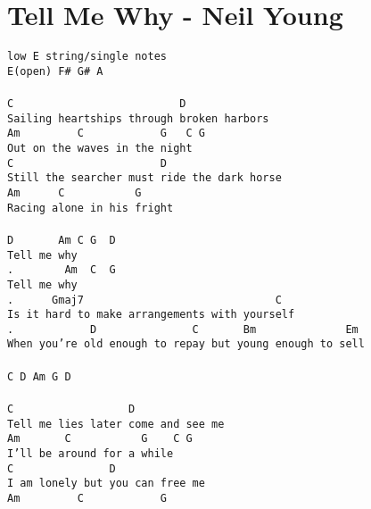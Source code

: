 \newpage
\section{Tell Me Why - Neil Young}
\label{Tell Me Why - Neil Young}
\texttt{low\ E\ string/single\ notes\\
E(open)\ F\#\ G\#\ A\\
\\
C\ \ \ \ \ \ \ \ \ \ \ \ \ \ \ \ \ \ \ \ \ \ \ \ \ \ D\\
Sailing\ heartships\ through\ broken\ harbors\\
Am\ \ \ \ \ \ \ \ \ C\ \ \ \ \ \ \ \ \ \ \ \ G\ \ \ C\ G\\
Out\ on\ the\ waves\ in\ the\ night\ \\
C\ \ \ \ \ \ \ \ \ \ \ \ \ \ \ \ \ \ \ \ \ \ \ D\\
Still\ the\ searcher\ must\ ride\ the\ dark\ horse\\
Am\ \ \ \ \ \ C\ \ \ \ \ \ \ \ \ \ \ G\\
Racing\ alone\ in\ his\ fright\\
\\
D\ \ \ \ \ \ \ Am\ C\ G\ \ D\\
Tell\ me\ why\ \ \\
.\ \ \ \ \ \ \ \ Am\ \ C\ \ G\\
Tell\ me\ why\ \ \\
.\ \ \ \ \ \ Gmaj7\ \ \ \ \ \ \ \ \ \ \ \ \ \ \ \ \ \ \ \ \ \ \ \ \ \ \ \ \ \ C\\
Is\ it\ hard\ to\ make\ arrangements\ with\ yourself\\
.\ \ \ \ \ \ \ \ \ \ \ \ D\ \ \ \ \ \ \ \ \ \ \ \ \ \ \ C\ \ \ \ \ \ \ Bm\ \ \ \ \ \ \ \ \ \ \ \ \ \ Em\ \ \ \\
When\ you're\ old\ enough\ to\ repay\ but\ young\ enough\ to\ sell\\
\\
C\ D\ Am\ G\ D\\
\\
C\ \ \ \ \ \ \ \ \ \ \ \ \ \ \ \ \ \ D\\
Tell\ me\ lies\ later\ come\ and\ see\ me\\
Am\ \ \ \ \ \ \ C\ \ \ \ \ \ \ \ \ \ \ G\ \ \ \ C\ G\\
I'll\ be\ around\ for\ a\ while\ \\
C\ \ \ \ \ \ \ \ \ \ \ \ \ \ \ D\\
I\ am\ lonely\ but\ you\ can\ free\ me\\
Am\ \ \ \ \ \ \ \ \ C\ \ \ \ \ \ \ \ \ \ \ \ G\\
}
